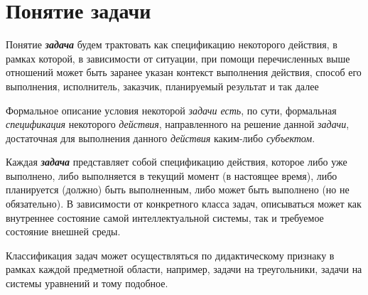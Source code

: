 \begin{comment}
Для конкретизации факта безуспешности выполнения некоторого действия в системе могут также использоваться дополнительные подмножества данного множества, при необходимости снабженные естественно-языковыми или формальными комментариями.

Во множество \textbf{\textit{действий, выполненных с ошибкой}}, попадают \textit{действия}, выполнение которых не было успешно завершено с точки зрения \textit{субъекта}, осуществлявшего их выполнение, по причине возникновения какой-либо ошибки, например, некорректности спецификации данного \textit{действия} или нарушения ее целостности каким-либо \textit{субъектом} (в случае \textit{действия в sc-памяти}).
\end{comment}

\section{Понятие задачи}
\label{sec_problem_concept}

Понятие \textbf{\textit{задача}} будем трактовать как спецификацию некоторого действия, в рамках которой, в зависимости от ситуации, при помощи перечисленных выше отношений может быть заранее указан контекст выполнения действия, способ его выполнения, исполнитель, заказчик, планируемый результат и так далее

Формальное описание условия некоторой \textit{задачи есть}, по сути, формальная \textit{спецификация} некоторого \textit{действия}, направленного на решение данной \textit{задачи}, достаточная для выполнения данного \textit{действия} каким-либо \textit{субъектом}.

Каждая \textbf{\textit{задача}} представляет собой спецификацию действия, которое либо уже выполнено, либо выполняется в текущий момент (в настоящее время), либо планируется (должно) быть выполненным, либо может быть выполнено (но не обязательно). В зависимости от конкретного класса задач, описываться может как внутреннее состояние самой интеллектуальной системы, так и требуемое состояние внешней среды.

Классификация задач может осуществляться по дидактическому признаку в рамках каждой предметной области, например, задачи на треугольники, задачи на системы уравнений и тому подобное.

